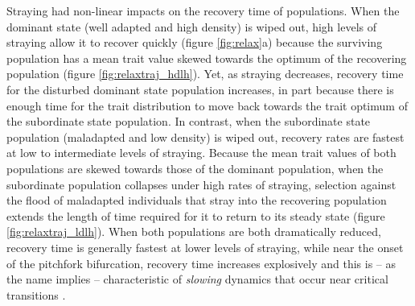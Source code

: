 \documentclass{revtex4}
\begin{document}
Straying had non-linear impacts on the recovery time of populations. 
When the dominant state (well adapted and high density) is wiped out, high levels of straying allow it to recover quickly (figure \ref{fig:relax}a) because the surviving population has a mean trait value skewed towards the optimum of the recovering population (figure \ref{fig:relaxtraj_hdlh}).
Yet, as straying decreases, recovery time for the disturbed dominant state population increases, in part because there is enough time for the trait distribution to move back towards the trait optimum of the subordinate state population.
In contrast, when the subordinate state population (maladapted and low density) is wiped out, recovery rates are fastest at low to intermediate levels of straying.
Because the mean trait values of both populations are skewed towards those of the dominant population, when the subordinate population collapses under high rates of straying, selection against the flood of maladapted individuals that stray into the recovering population extends the length of time required for it to return to its steady state (figure \ref{fig:relaxtraj_ldlh}).
When both populations are both dramatically reduced, recovery time is generally fastest at lower levels of straying, while near the onset of the pitchfork bifurcation, recovery time increases explosively and this is -- as the name implies -- characteristic of \emph{slowing} dynamics that occur near critical transitions \citep{Scheffer:2009gg,Kuehn:2010p2591}.\\
\end{document}
